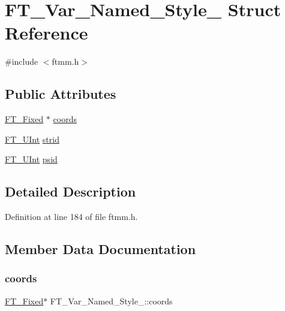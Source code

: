 \hypertarget{struct_f_t___var___named___style__}{}\section{F\+T\+\_\+\+Var\+\_\+\+Named\+\_\+\+Style\+\_\+ Struct Reference}
\label{struct_f_t___var___named___style__}


{\ttfamily \#include $<$ftmm.\+h$>$}

\subsection*{Public Attributes}
\begin{DoxyCompactItemize}
\item 
\mbox{\hyperlink{fttypes_8h_a5f5a679cc09f758efdd0d1c5feed3c3d}{F\+T\+\_\+\+Fixed}} $\ast$ \mbox{\hyperlink{struct_f_t___var___named___style___a07195d55aee541db651ef3a8b04bb41f}{coords}}
\item 
\mbox{\hyperlink{fttypes_8h_abcb8db4dbf35d2b55a9e8c7b0926dc52}{F\+T\+\_\+\+U\+Int}} \mbox{\hyperlink{struct_f_t___var___named___style___a7802f6958c6e883bdce16b9931002826}{strid}}
\item 
\mbox{\hyperlink{fttypes_8h_abcb8db4dbf35d2b55a9e8c7b0926dc52}{F\+T\+\_\+\+U\+Int}} \mbox{\hyperlink{struct_f_t___var___named___style___a91b36c5ad8302f454399b6091c5ce170}{psid}}
\end{DoxyCompactItemize}


\subsection{Detailed Description}


Definition at line 184 of file ftmm.\+h.



\subsection{Member Data Documentation}
\mbox{\label{struct_f_t___var___named___style___a07195d55aee541db651ef3a8b04bb41f}} 
\subsubsection{\texorpdfstring{coords}{coords}}
{\footnotesize\ttfamily \mbox{\hyperlink{fttypes_8h_a5f5a679cc09f758efdd0d1c5feed3c3d}{F\+T\+\_\+\+Fixed}}$\ast$ F\+T\+\_\+\+Var\+\_\+\+Named\+\_\+\+Style\+\_\+\+::coords}



